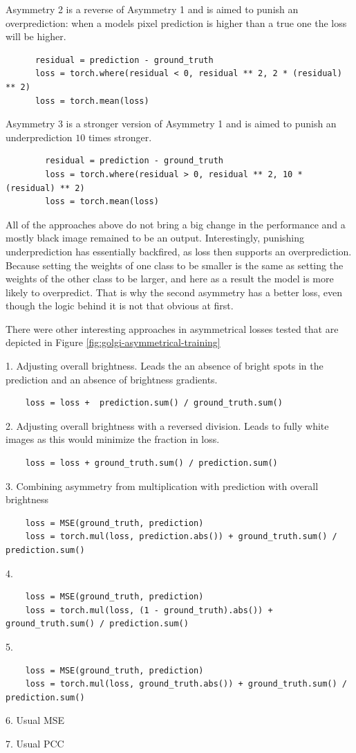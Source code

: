 Asymmetry 2 is a reverse of Asymmetry 1 and is aimed to punish an overprediction: when a models pixel prediction is higher than a true one the loss will be higher.
  \begin{lstlisting}
	  residual = prediction - ground_truth
	  loss = torch.where(residual < 0, residual ** 2, 2 * (residual) ** 2)
	  loss = torch.mean(loss)
	\end{lstlisting}

Asymmetry 3 is a stronger version of Asymmetry 1 and is aimed to punish an underprediction $10$ times stronger.
	\begin{lstlisting}
		residual = prediction - ground_truth
		loss = torch.where(residual > 0, residual ** 2, 10 * (residual) ** 2)
		loss = torch.mean(loss)
	  \end{lstlisting}

All of the approaches above do not bring a big change in the performance and a mostly black image remained to be an output. Interestingly, punishing underprediction has essentially backfired, as loss then supports an overprediction. Because setting the weights of one class to be smaller is the same as setting the weights of the other class to be larger, and here as a result the model is more likely to overpredict. That is why the second asymmetry has a better loss, even though the logic behind it is not that obvious at first. 

There were other interesting approaches in asymmetrical losses tested that are depicted in Figure \ref{fig:golgi-asymmetrical-training}

1. Adjusting overall brightness. Leads the an absence of bright spots in the prediction and an absence of brightness gradients.
\begin{lstlisting}
	loss = loss +  prediction.sum() / ground_truth.sum()
  \end{lstlisting}

2. Adjusting overall brightness with a reversed division. Leads to fully white images as this would minimize the fraction in loss.
\begin{lstlisting}
	loss = loss + ground_truth.sum() / prediction.sum()
\end{lstlisting}

3. Combining asymmetry from multiplication with prediction with overall brightness

\begin{lstlisting}
	loss = MSE(ground_truth, prediction)
	loss = torch.mul(loss, prediction.abs()) + ground_truth.sum() / prediction.sum()
\end{lstlisting}

4.
\begin{lstlisting}
	loss = MSE(ground_truth, prediction)
	loss = torch.mul(loss, (1 - ground_truth).abs()) + ground_truth.sum() / prediction.sum()
\end{lstlisting}

5.
\begin{lstlisting}
	loss = MSE(ground_truth, prediction)
	loss = torch.mul(loss, ground_truth.abs()) + ground_truth.sum() / prediction.sum()
\end{lstlisting}

6. Usual MSE

7. Usual PCC